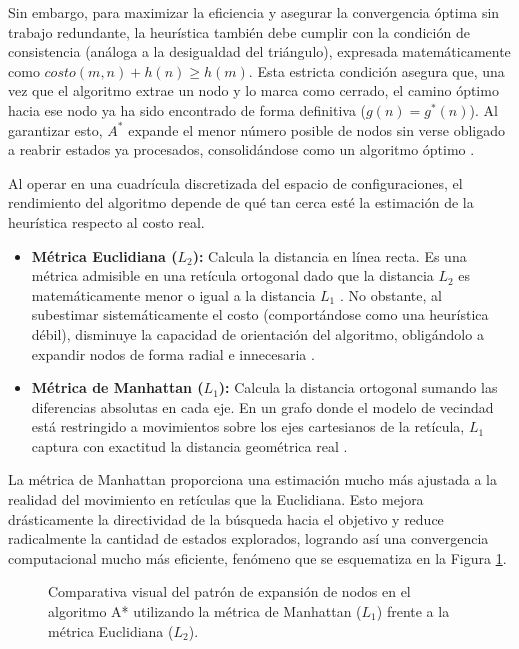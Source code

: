 Sin embargo, para maximizar la eficiencia y asegurar la convergencia óptima sin trabajo 
redundante, la heurística también debe cumplir con la condición de consistencia 
(análoga a la desigualdad del triángulo), expresada matemáticamente como 
$costo(m, n) + h(n) \ge h(m)$. Esta estricta condición asegura que, 
una vez que el algoritmo extrae un nodo y lo marca como cerrado, el camino óptimo hacia 
ese nodo ya ha sido encontrado de forma definitiva ($g(n) = g^*(n)$). Al garantizar 
esto, $A^*$ expande el menor número posible de nodos sin verse obligado a reabrir 
estados ya procesados, consolidándose como un algoritmo óptimo \parencite{Hart1968}.

Al operar en una cuadrícula discretizada del espacio de configuraciones, el rendimiento del 
algoritmo depende de qué tan cerca esté la estimación de la heurística respecto al costo real. 

\begin{itemize}
\item \textbf{Métrica Euclidiana ($L_2$):} Calcula la distancia en línea recta. Es una métrica admisible 
en una retícula ortogonal dado que la distancia $L_2$ es matemáticamente menor o igual a 
la distancia $L_1$ \parencite{Choset2005}. No obstante, al subestimar sistemáticamente el costo (comportándose como una heurística débil), 
disminuye la capacidad de orientación del algoritmo, obligándolo a expandir nodos de forma radial 
e innecesaria \parencite{Hart1968}.
\item \textbf{Métrica de Manhattan ($L_1$):} Calcula la distancia ortogonal sumando las diferencias 
absolutas en cada eje. En un grafo donde el modelo de vecindad 
está restringido a movimientos sobre los ejes cartesianos de la retícula, $L_1$ captura con exactitud 
la distancia geométrica real \parencite{lavalle2006planning}.
\end{itemize}

La métrica de Manhattan proporciona una estimación mucho más ajustada a la realidad del 
movimiento en retículas que la Euclidiana. Esto mejora drásticamente la directividad de 
la búsqueda hacia el objetivo y reduce radicalmente la cantidad de estados explorados, 
logrando así una convergencia computacional mucho más eficiente, fenómeno que se 
esquematiza en la Figura \ref{fig:comparativa_metricas_Astar}.

\begin{figure}[htbp]
    \centering
    

    \caption{Comparativa visual del patrón de expansión de nodos en el algoritmo A* utilizando la métrica de Manhattan ($L_1$) frente a la métrica Euclidiana ($L_2$).}
    \label{fig:comparativa_metricas_Astar}
\end{figure}

